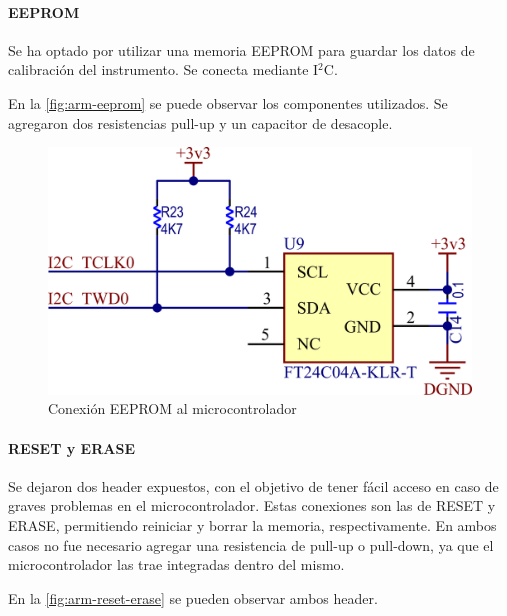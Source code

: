\documentclass[titlepage, 12pt]{article}
\begin{document}
\paragraph{EEPROM}
Se ha optado por utilizar una memoria EEPROM para guardar los datos de calibración del instrumento. Se conecta mediante I$^2$C.

En la \autoref{fig:arm-eeprom} se puede observar los componentes utilizados. Se agregaron dos resistencias pull-up y un capacitor de desacople.

    \begin{figure}[!htbp]
        \centering
        \includegraphics[scale=1.5]{images/arm-eeprom.png}
        \caption{Conexión EEPROM al microcontrolador}
        \label{fig:arm-eeprom}
    \end{figure}

 \paragraph{RESET y ERASE}
Se dejaron dos header expuestos, con el objetivo de tener fácil acceso en caso de graves problemas en el microcontrolador. Estas conexiones son las de RESET y ERASE, permitiendo reiniciar y borrar la memoria, respectivamente. En ambos casos no fue necesario agregar una resistencia de pull-up o pull-down, ya que el microcontrolador las trae integradas dentro del mismo.

En la \autoref{fig:arm-reset-erase} se pueden observar ambos header.
\end{document}
